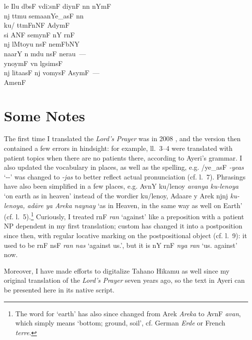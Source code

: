 \documentclass[12pt,paper=a4]{scrartcl}
\newcommand{\fw}[1]{\textit{#1}} %
\newcommand{\tit}[1]{\textit{#1}} %
\newcommand{\qq}[1]{\enquote*{#1}} %
\newcommand{\ayr}[1]{{\Tagati #1}}
\newenvironment{ayeri}{
    \Tagati
}{
}
\begin{document}
\begin{raggedright}
\begin{multicols}{2}
\begin{ayeri}
\begin{linenumbers*}
le Ilu dbsF vdiːsnF diynF nn nYmF \\
nj ttmu semaanYe\_asF nn \\
ku/ ttmFnNF AdymF \\
si ANF semynF nY rnF \\
nj lMtoyu nsF nemFbNY \\
naarY n mdu nsF nerau~— \\ [0.5\baselineskip]

ynoymF vn lgsimsF \\
nj litaasF nj vomysF AsymF~— \\ [0.5\baselineskip]

AmenF

\end{linenumbers*}

\end{ayeri}
\end{multicols}
\end{raggedright}

\section{Some Notes}
The first time I translated the \tit{Lord's Prayer} was in 2008 
\parencite[cf.][]{becker2008}, and the version then contained a few errors in 
hindsight: for example, ll.~3--4 were translated with patient topics when there 
are no patients there, according to Ayeri's grammar. I also updated the 
vocabulary in places, as well as the spelling, e.g. \ayr{/ye\_asF} \fw{-yeas} 
\qq{-\Pl{}-\Parg{}} was changed to \fw{-jas} to better reflect actual 
pronunciation (cf. l.~7). Phrasings have also been simplified in a few places, 
e.g. \ayr{AvnY ku/lenoy} \fw{avanya ku-lenoya} `on earth as in heaven' instead 
of the wordier \ayr{ku/lenoy, Adaare y Arek njnj} \fw{ku-lenoya, adāre 
ya Areka naynay} `as in Heaven, in the same way as well on Earth' (cf. 
l.~5).\footnote{The word for `earth' has also since changed from \ayr{Arek} 
\fw{Areka} to \ayr{AvnF} \fw{avan}, which simply means `bottom; ground, soil', 
cf. German \fw{Erde} or French \fw{terre}.} Curiously, I treated \ayr{rnF} 
\fw{ran} `against' like a preposition with a patient NP dependent in my first 
translation; custom has changed it into a postposition since then, with regular 
locative marking on the postpositional object (cf. l.~9): it used to be 
\ayr{rnF nsF} \fw{ran nas} `against us.\Parg{}', but it is \ayr{nY rnF} 
\fw{nya ran} `us.\Loc{} against' now.

Moreover, I have made efforts to digitalize Tahano Hikamu as well since my 
original translation of the \tit{Lord's Prayer} seven years ago, so the text 
in Ayeri can be presented here in its native script.
\end{document}
